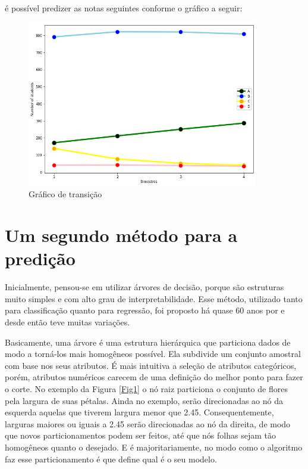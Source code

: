 \documentclass{article}
\begin{document}
é possível predizer as notas seguintes conforme o gráfico a seguir:

\begin{figure}[H]
\centering
\includegraphics[width=0.9\textwidth]{graf.png}
\caption{Gráfico de transição}
\label{graf}
\end{figure}


\section{Um segundo método para a predição} \label{sec:firstpage}

Inicialmente, pensou-se em utilizar árvores de decisão, porque são estruturas muito simples e com alto grau de interpretabilidade. Esse método, utilizado tanto para classificação quanto para regressão, foi proposto há quase 60 anos por \cite{Morgan_1963} e desde então teve muitas variações.

Basicamente, uma árvore é uma estrutura hierárquica que particiona dados de modo a torná-los mais homogêneos possível. Ela subdivide um conjunto amostral com base nos seus atributos. É mais intuitiva a seleção de atributos categóricos, porém, atributos numéricos carecem de uma definição do melhor ponto para fazer o corte. No exemplo da Figura \ref{Fig1} o nó raiz particiona o conjunto de flores pela largura de suas pétalas. Ainda no exemplo, serão direcionadas ao nó da esquerda aquelas que tiverem largura menor que 2.45. Consequentemente, larguras maiores ou iguais a 2.45 serão direcionadas ao nó da direita, de modo que novos particionamentos podem ser feitos, até que nós folhas sejam tão homogêneos quanto o desejado. E é majoritariamente, no modo como o algoritmo faz esse particionamento é que define qual é o seu modelo.
\end{document}
